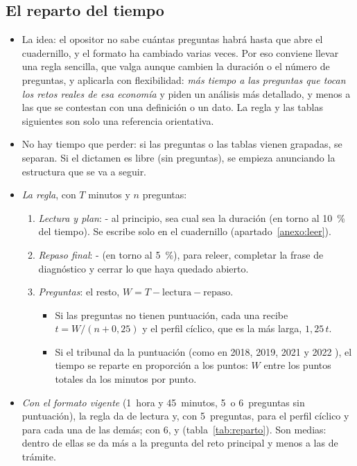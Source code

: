 \documentclass[11pt]{article}
\begin{document}
\subsection{El reparto del tiempo}\label{anexo:tiempo}

\begin{itemize}
\item La idea: el opositor no sabe cuántas preguntas habrá hasta que abre el cuadernillo, y el formato ha cambiado varias veces. Por eso conviene llevar una regla sencilla, que valga aunque cambien la duración o el número de preguntas, y aplicarla con flexibilidad: \emph{más tiempo a las preguntas que tocan los retos reales de esa economía} y piden un análisis más detallado, y menos a las que se contestan con una definición o un dato. La regla y las tablas siguientes son solo una referencia orientativa.
\item No hay tiempo que perder: si las preguntas o las tablas vienen grapadas, se separan. Si el dictamen es libre (sin preguntas), se empieza anunciando la estructura que se va a seguir.
\item \emph{La regla}, con $T$ minutos y $n$ preguntas:
  \begin{enumerate}
  \item \emph{Lectura y plan}: - al principio, sea cual sea la duración (en torno al 10~\% del tiempo). Se escribe solo en el cuadernillo (apartado~\ref{anexo:leer}).
  \item \emph{Repaso final}: - (en torno al 5~\%), para releer, completar la frase de diagnóstico y cerrar lo que haya quedado abierto.
  \item \emph{Preguntas}: el resto, $W=T-\text{lectura}-\text{repaso}$.
    \begin{itemize}
    \item Si las preguntas no tienen puntuación, cada una recibe $t=W/(n+0{,}25)$ y el perfil cíclico, que es la más larga, $1{,}25\,t$.
    \item Si el tribunal da la puntuación (como en 2018, 2019, 2021 y 2022 \parencite{ATCEE2026Examenes}), el tiempo se reparte en proporción a los puntos: $W$ entre los puntos totales da los minutos por punto.
    \end{itemize}
  \end{enumerate}
\item \emph{Con el formato vigente} (1~hora y 45~minutos, 5~o 6~preguntas sin puntuación), la regla da  de lectura y, con 5~preguntas,  para el perfil cíclico y  para cada una de las demás; con 6,  y  (tabla~\ref{tab:reparto}). Son medias: dentro de ellas se da más a la pregunta del reto principal y menos a las de trámite.
\end{itemize}
\end{document}
